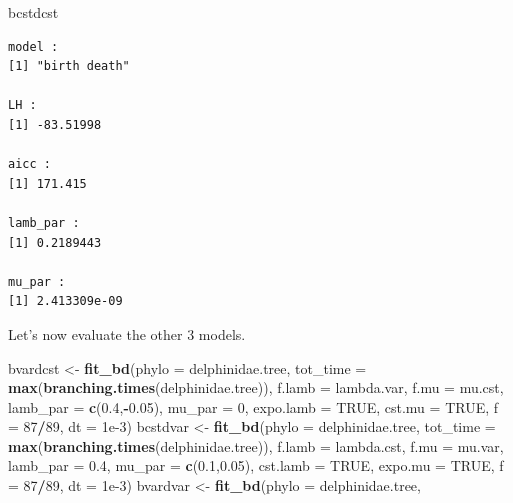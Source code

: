 \documentclass[
]{book}
\newenvironment{Shaded}{\begin{snugshade}}{\end{snugshade}}
\newcommand{\DataTypeTok}[1]{\textcolor[rgb]{0.13,0.29,0.53}{#1}}
\newcommand{\DecValTok}[1]{\textcolor[rgb]{0.00,0.00,0.81}{#1}}
\newcommand{\FloatTok}[1]{\textcolor[rgb]{0.00,0.00,0.81}{#1}}
\newcommand{\KeywordTok}[1]{\textcolor[rgb]{0.13,0.29,0.53}{\textbf{#1}}}
\newcommand{\NormalTok}[1]{#1}
\newcommand{\OperatorTok}[1]{\textcolor[rgb]{0.81,0.36,0.00}{\textbf{#1}}}
\newcommand{\OtherTok}[1]{\textcolor[rgb]{0.56,0.35,0.01}{#1}}
\newcommand{\StringTok}[1]{\textcolor[rgb]{0.31,0.60,0.02}{#1}}
\begin{document}
\begin{Shaded}
\begin{Highlighting}[]
\NormalTok{bcstdcst}
\end{Highlighting}
\end{Shaded}

\begin{verbatim}
model :
[1] "birth death"

LH :
[1] -83.51998

aicc :
[1] 171.415

lamb_par :
[1] 0.2189443

mu_par :
[1] 2.413309e-09
\end{verbatim}

Let's now evaluate the other 3 models.

\begin{Shaded}
\begin{Highlighting}[]
\NormalTok{bvardcst \textless{}{-}}\StringTok{ }\KeywordTok{fit\_bd}\NormalTok{(}\DataTypeTok{phylo =}\NormalTok{ delphinidae.tree, }
                   \DataTypeTok{tot\_time =} \KeywordTok{max}\NormalTok{(}\KeywordTok{branching.times}\NormalTok{(delphinidae.tree)),}
                   \DataTypeTok{f.lamb =}\NormalTok{ lambda.var, }\DataTypeTok{f.mu =}\NormalTok{ mu.cst,}
                   \DataTypeTok{lamb\_par =} \KeywordTok{c}\NormalTok{(}\FloatTok{0.4}\NormalTok{,}\OperatorTok{{-}}\FloatTok{0.05}\NormalTok{), }\DataTypeTok{mu\_par =} \DecValTok{0}\NormalTok{,}
                   \DataTypeTok{expo.lamb =} \OtherTok{TRUE}\NormalTok{, }\DataTypeTok{cst.mu =} \OtherTok{TRUE}\NormalTok{,}
                   \DataTypeTok{f =} \DecValTok{87}\OperatorTok{/}\DecValTok{89}\NormalTok{, }\DataTypeTok{dt =} \FloatTok{1e{-}3}\NormalTok{)}
\NormalTok{bcstdvar \textless{}{-}}\StringTok{ }\KeywordTok{fit\_bd}\NormalTok{(}\DataTypeTok{phylo =}\NormalTok{ delphinidae.tree, }
                   \DataTypeTok{tot\_time =} \KeywordTok{max}\NormalTok{(}\KeywordTok{branching.times}\NormalTok{(delphinidae.tree)),}
                   \DataTypeTok{f.lamb =}\NormalTok{ lambda.cst, }\DataTypeTok{f.mu =}\NormalTok{ mu.var,}
                   \DataTypeTok{lamb\_par =} \FloatTok{0.4}\NormalTok{, }\DataTypeTok{mu\_par =} \KeywordTok{c}\NormalTok{(}\FloatTok{0.1}\NormalTok{,}\FloatTok{0.05}\NormalTok{),}
                   \DataTypeTok{cst.lamb =} \OtherTok{TRUE}\NormalTok{, }\DataTypeTok{expo.mu =} \OtherTok{TRUE}\NormalTok{,}
                   \DataTypeTok{f =} \DecValTok{87}\OperatorTok{/}\DecValTok{89}\NormalTok{, }\DataTypeTok{dt =} \FloatTok{1e{-}3}\NormalTok{)}
\NormalTok{bvardvar \textless{}{-}}\StringTok{ }\KeywordTok{fit\_bd}\NormalTok{(}\DataTypeTok{phylo =}\NormalTok{ delphinidae.tree, }

\end{Highlighting}
\end{Shaded}
\end{document}
